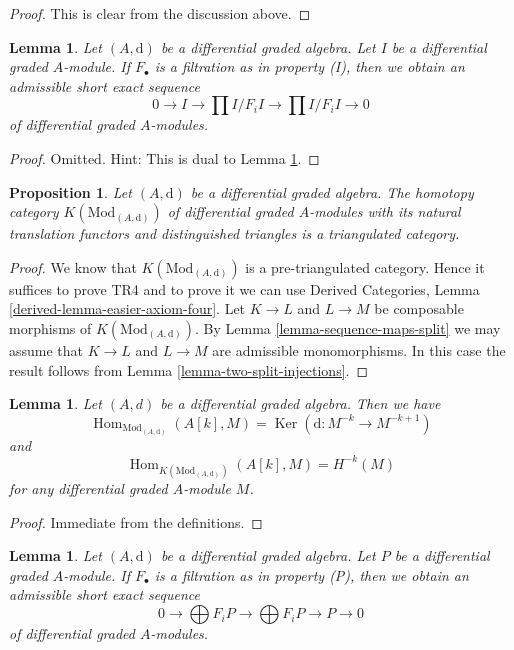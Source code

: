 \documentclass{stacks-project}
\theoremstyle{plain}
\newtheorem{proposition}[subsection]{Proposition}
\newtheorem{lemma}[subsection]{Lemma}
\theoremstyle{definition}
\theoremstyle{remark}
\numberwithin{equation}{subsection}
\def\Hom{\mathop{\mathrm{Hom}}\nolimits}
\def\Ker{\mathop{\mathrm{Ker}}}
\begin{document}
\begin{proof}
This is clear from the discussion above.
\end{proof}

\begin{lemma}
\label{lemma-property-I-sequence}
Let $(A, \text{d})$ be a differential graded algebra.
Let $I$ be a differential graded $A$-module. If $F_\bullet$
is a filtration as in property (I), then we obtain an
admissible short exact sequence
$$
0 \to I \to
\prod\nolimits I/F_iI \to
\prod\nolimits I/F_iI \to 0
$$
of differential graded $A$-modules.
\end{lemma}

\begin{proof}
Omitted. Hint: This is dual to Lemma \ref{lemma-property-P-sequence}.
\end{proof}

\begin{proposition}
\label{proposition-homotopy-category-triangulated}
Let $(A, \text{d})$ be a differential graded algebra. The homotopy category
$K(\text{Mod}_{(A, \text{d})})$ of differential graded $A$-modules with its
natural translation functors and distinguished triangles is a triangulated
category.
\end{proposition}

\begin{proof}
We know that $K(\text{Mod}_{(A, \text{d})})$ is a pre-triangulated category.
Hence it suffices to prove TR4 and to prove it we can use
Derived Categories, Lemma \ref{derived-lemma-easier-axiom-four}.
Let $K \to L$ and $L \to M$ be composable morphisms of
$K(\text{Mod}_{(A, \text{d})})$. By
Lemma \ref{lemma-sequence-maps-split} we may assume that
$K \to L$ and $L \to M$ are admissible monomorphisms.
In this case the result follows from
Lemma \ref{lemma-two-split-injections}.
\end{proof}

\begin{lemma}
\label{lemma-hom-from-shift-free}
Let $(A, d)$ be a differential graded algebra. Then we have
$$
\Hom_{\text{Mod}_{(A, \text{d})}}(A[k], M) =
\Ker(\text{d} : M^{-k} \to M^{-k + 1})
$$
and
$$
\Hom_{K(\text{Mod}_{(A, \text{d})})}(A[k], M) = H^{-k}(M)
$$
for any differential graded $A$-module $M$.
\end{lemma}

\begin{proof}
Immediate from the definitions.
\end{proof}

\begin{lemma}
\label{lemma-property-P-sequence}
Let $(A, \text{d})$ be a differential graded algebra.
Let $P$ be a differential graded $A$-module. If $F_\bullet$
is a filtration as in property (P), then we obtain an
admissible short exact sequence
$$
0 \to
\bigoplus\nolimits F_iP \to
\bigoplus\nolimits F_iP \to P \to 0
$$
of differential graded $A$-modules.
\end{lemma}
\end{document}

